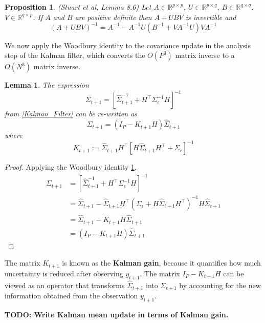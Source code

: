 \documentclass[12pt]{article}
\newcommand{\R}{\mathbb{R}}
\newtheorem{prop}{Proposition}
\newtheorem{lemma}{Lemma}
\begin{document}
\begin{prop} (Stuart et al, Lemma 8.6) \label{Woodbury}
Let $A \in \R^{p \times p}$, $U \in \R^{p \times q}$, $B \in \R^{q \times q}$, $V \in \R^{q \times p}$. If $A$ and $B$ are positive definite then $A + UBV$ is invertible 
and 
\[(A + UBV)^{-1} = A^{-1} - A^{-1} U\left(B^{-1} + VA^{-1}U\right)VA^{-1}\]
\end{prop}

We now apply the Woodbury identity to the covariance update in the analysis step of the Kalman filter, which converts the $O(P^3)$ matrix inverse to a $O(N^3)$ 
matrix inverse. 

\begin{lemma} 
The expression 
\[\Sigma_{t + 1} = \left[\hat{\Sigma}^{-1}_{t + 1} + H^\top \Sigma_{\epsilon}^{-1} H \right]^{-1}\]
from \ref{Kalman_Filter} can be re-written as 
\[\Sigma_{t + 1} = \left(I_P - K_{t+1}H \right)\hat{\Sigma}_{t+1}\]
where 
\[K_{t+1} := \hat{\Sigma}_{t+1} H^{\top} \left[H\hat{\Sigma}_{t+1} H^\top + \Sigma_{\epsilon} \right]^{-1} \]
\end{lemma}

\begin{proof}
Applying the Woodbury identity \ref{Woodbury}, 
\begin{align*}
\Sigma_{t + 1} &= \left[\hat{\Sigma}^{-1}_{t + 1} + H^\top \Sigma_{\epsilon}^{-1} H \right]^{-1} \\
		       &= \hat{\Sigma}_{t + 1} - \hat{\Sigma}_{t + 1} H^{\top} \left(\Sigma_{\epsilon} + H\hat{\Sigma}_{t + 1}H^\top \right)^{-1} H \hat{\Sigma}_{t + 1} \\
		       &= \hat{\Sigma}_{t + 1} - K_{t+1} H \hat{\Sigma}_{t + 1} \\
		       &= \left(I_P - K_{t+1}H \right)\hat{\Sigma}_{t+1}
\end{align*}
\end{proof}
The matrix $K_{t + 1}$ is known as the \textbf{Kalman gain}, because it quantifies how much uncertainty is reduced after observing $y_{t+1}$. The matrix 
 $I_P - K_{t+1}H$ can be viewed as an operator that transforms $\hat{\Sigma}_{t+1}$ into $\Sigma_{t + 1}$ by accounting for the new information obtained 
 from the observation $y_{t+1}$. 
 
\textbf{TODO: Write Kalman mean update in terms of Kalman gain.} 

\end{document}
